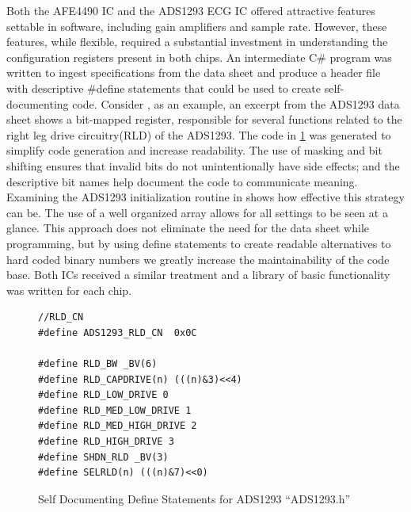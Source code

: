 Both the AFE4490  IC and the ADS1293 ECG IC offered attractive features settable in software, including gain amplifiers and sample rate. However, these features, while flexible, required a substantial investment in understanding the configuration registers present in both chips. An intermediate C\# program was written to ingest specifications from the data sheet and produce a header file with descriptive \#define statements that could be used to create self-documenting code. Consider , as an example, an excerpt from the ADS1293 data sheet shows a  bit-mapped register, responsible for several functions related to the right leg drive circuitry(RLD) of the ADS1293. The code in \cref{fig:ADS1293_Defines} was generated to simplify code generation and increase readability. The use of masking and bit shifting ensures that invalid bits do not unintentionally have side effects; and the descriptive bit names help document the code to communicate meaning. Examining the ADS1293 initialization routine in  shows how effective this strategy can be. The use of a well organized array allows for all settings to be seen at a glance. This approach does not eliminate the need for the data sheet while programming, but by using define statements to create readable alternatives to hard coded binary numbers we greatly increase the maintainability of the code base. Both ICs received a similar treatment and a library of basic functionality was written for each chip.

\begin{figure}
	\begin{center}
		\label{fig:ADS1293_Defines}
\begin{lstlisting}[frame=single]
//RLD_CN
#define ADS1293_RLD_CN  0x0C

#define RLD_BW _BV(6)
#define RLD_CAPDRIVE(n) (((n)&3)<<4)
#define RLD_LOW_DRIVE 0
#define RLD_MED_LOW_DRIVE 1
#define RLD_MED_HIGH_DRIVE 2
#define RLD_HIGH_DRIVE 3
#define SHDN_RLD _BV(3)
#define SELRLD(n) (((n)&7)<<0)
\end{lstlisting}
		\caption{Self Documenting Define Statements for ADS1293 ``ADS1293.h''}
	\end{center}
\end{figure}


